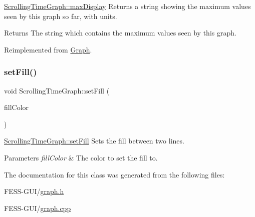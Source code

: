 \hyperlink{class_scrolling_time_graph_a3d0314f268e3eeb7396733147f710ef0}{Scrolling\+Time\+Graph\+::max\+Display} Returns a string showing the maximum values seen by this graph so far, with units. 

\begin{DoxyReturn}{Returns}
The string which contains the maximum values seen by this graph. 
\end{DoxyReturn}


Reimplemented from \hyperlink{class_graph_a5102e5e984c2ddebb79b9771b9d37f9f}{Graph}.

\hypertarget{class_scrolling_time_graph_a651e6922d732be7084c207cc94257bd7}{}\label{class_scrolling_time_graph_a651e6922d732be7084c207cc94257bd7} 
\subsubsection{\texorpdfstring{set\+Fill()}{setFill()}}
{\footnotesize\ttfamily void Scrolling\+Time\+Graph\+::set\+Fill (\begin{DoxyParamCaption}\item[{Q\+Color}]{fill\+Color }\end{DoxyParamCaption})}



\hyperlink{class_scrolling_time_graph_a651e6922d732be7084c207cc94257bd7}{Scrolling\+Time\+Graph\+::set\+Fill} Sets the fill between two lines. 


\begin{DoxyParams}{Parameters}
{\em fill\+Color} & The color to set the fill to. \\
\hline
\end{DoxyParams}


The documentation for this class was generated from the following files\+:\begin{DoxyCompactItemize}
\item 
F\+E\+S\+S-\/\+G\+U\+I/\hyperlink{graph_8h}{graph.\+h}\item 
F\+E\+S\+S-\/\+G\+U\+I/\hyperlink{graph_8cpp}{graph.\+cpp}\end{DoxyCompactItemize}
